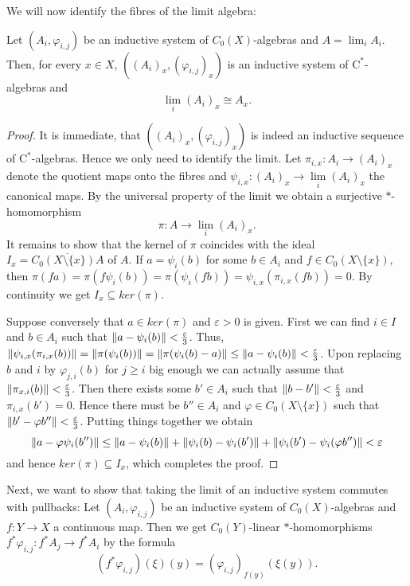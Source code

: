 	We will now identify the fibres of the limit algebra:
	\begin{lemma}
		Let $(A_i,\varphi_{i,j})$ be an inductive system of $C_0(X)$-al\-gebras and $A=\lim_{i} A_i$. Then, for every $x\in X$, $((A_i)_x,(\varphi_{i,j})_x)$ is an inductive system of $\mathrm{C}^*$-algebras and
		$$ \lim\limits_{i} (A_i)_x\cong A_x.$$
	\end{lemma}
	\begin{proof}
		It is immediate, that $((A_i)_x,(\varphi_{i,j})_x)$ is indeed an inductive sequence of $\mathrm{C}^*$-algebras. Hence we only need to identify the limit.
		Let $\pi_{i,x}:A_i\rightarrow (A_i)_x$ denote the quotient maps onto the fibres and $\psi_{i,x}:(A_i)_x\rightarrow \lim\limits_{i}(A_i)_x$ the canonical maps. By the universal property of the limit we obtain a surjective $*$-homo\-morphism $$\pi:A\rightarrow \lim\limits_{i}(A_i)_x.$$
		It remains to show that the kernel of $\pi$ coincides with the ideal $I_x=\overline{C_0(X\setminus\lbrace x\rbrace)A}$ of $A$.
		If $a=\psi_i(b)$ for some $b\in A_i$ and $f\in C_0(X\setminus\lbrace x\rbrace)$, then $\pi(fa)=\pi(f\psi_i(b))=\pi(\psi_i(fb))=\psi_{i,x}(\pi_{i,x}(fb))=0$. By continuity we get $I_x\subseteq ker(\pi)$.
		
		Suppose conversely that $a\in ker(\pi)$ and $\varepsilon>0$ is given. First we can find $i\in I$ and $b\in A_i$ such that $\lVert a-\psi_i(b)\rVert<\frac{\varepsilon}{3}$. Thus,
		$\lVert\psi_{i,x}(\pi_{i,x}(b))\rVert=\lVert\pi(\psi_i(b))\rVert=\lVert\pi(\psi_i(b)-a)\rVert\leq \lVert a-\psi_i(b)\rVert<\frac{\varepsilon}{3}$.
		Upon replacing $b$ and $i$ by $\varphi_{j,i}(b)$ for $j\geq i$ big enough we can actually assume that $\lVert\pi_{x,i}(b)\rVert<\frac{\varepsilon}{3}$. Then there exists some $b'\in A_i$ such that $\lVert b-b'\rVert<\frac{\varepsilon}{3}$ and $\pi_{i,x}(b')=0$. Hence there must be $b''\in A_i$ and $\varphi\in C_0(X\setminus\lbrace x\rbrace)$ such that $\lVert b'-\varphi b''\rVert<\frac{\varepsilon}{3}$.
		Putting things together we obtain
		$$\lVert a-\varphi\psi_i(b'')\rVert\leq \lVert a- \psi_i(b)\rVert+\lVert\psi_i(b)-\psi_i(b')\rVert+\lVert\psi_i(b')-\psi_i(\varphi b'')\rVert<\varepsilon$$
		and hence $ker(\pi)\subseteq I_x$, which completes the proof.
	\end{proof}
	Next, we want to show that taking the limit of an inductive system commutes with pullbacks: Let $(A_i,\varphi_{i,j})$ be an inductive system of $C_0(X)$-algebras and $f:Y\rightarrow X$ a continuous map. Then we get $C_0(Y)$-linear $*$-homo\-morphisms $f^*\varphi_{i,j}:f^*A_j\rightarrow f^* A_{i}$ by the formula $$(f^*\varphi_{i,j})(\xi)(y)=(\varphi_{i,j})_{f(y)}(\xi(y)).$$
